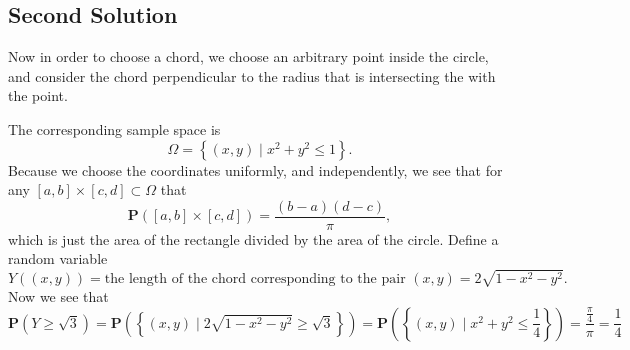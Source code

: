 \documentclass[11pt,a4paper]{article}
\theoremstyle{definition}
\theoremstyle{plain}
\newcommand{\set}[2]{ \left\{ #1 \mid #2 \right\} }
\begin{document}
  \subsection{Second Solution}
    Now in order to choose a chord, we choose an arbitrary point inside
    the circle, and consider the chord perpendicular to the radius that is
    intersecting the with the point.
    \begin{center}
    \end{center}
    The corresponding sample space is
    \[
      \Omega = \set{(x, y)}{ x^2 + y^2 \le 1}.
    \]
    Because we choose the coordinates uniformly, and independently, 
    we see that for any
    $[a,b] \times [c,d] \subset \Omega$ that
    \[
      \mathbf P([a,b] \times [c,d]) = \frac{(b-a)(d-c)}{\pi},
    \]
    which is just the area of the rectangle divided by the area of the circle.
    Define a random variable
    \[
      Y\left((x, y)\right) = \text{the length of the chord corresponding
      to the pair $(x, y)$} = 2 \sqrt{1 - x^2 - y^2}.
    \]
    Now we see that
    \[
      \mathbf P\left(Y \geq \sqrt{3}\right) = 
      \mathbf P\left(\set{(x,y)}{2 \sqrt{1 - x^2 - y^2} \geq \sqrt{3}}\right) =
      \mathbf P\left(\set{(x,y)}{x^2 + y^2 \le \frac{1}{4}}\right) =
      \frac{\frac{\pi}{4}}{\pi} =
      \frac{1}{4}
    \]
\end{document}
